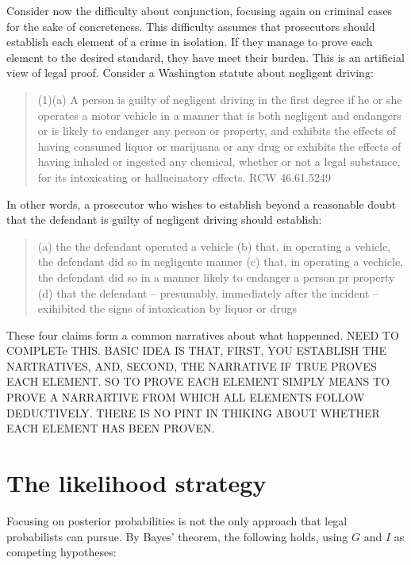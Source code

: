 \documentclass[10pt,dvipsnames,enabledeprecatedfontcommands]{scrartcl}
\begin{document}
Consider now the difficulty about conjunction, focusing again on
criminal cases for the sake of concreteness. This difficulty assumes
that prosecutors should establish each element of a crime in isolation.
If they manage to prove each element to the desired standard, they have
meet their burden. This is an artificial view of legal proof. Consider a
Washington statute about negligent driving:

\begin{quote}
(1)(a) A person is guilty of negligent driving in the first degree if he or she operates a motor vehicle in a manner that is both negligent and endangers or is likely to endanger any person or property, and exhibits the effects of having consumed liquor or marijuana or any drug or exhibits the effects of having inhaled or ingested any chemical, whether or not a legal substance, for its intoxicating or hallucinatory effects. RCW 46.61.5249
\end{quote}

\noindent In other words, a prosecutor who wishes to establish beyond a
reasonable doubt that the defendant is guilty of negligent driving
should establish:

\begin{quote}
(a) the the defendant operated a vehicle
(b) that, in operating a vehicle, the defendant did so in  negligente manner
(c) that, in operating a vechicle, the defendant did so in a manner likely to endanger a person pr property
(d) that the defendant -- presumably, immediately after the incident -- exihibited the signs of intoxication by liquor or drugs
\end{quote}

\noindent These four claims form a common narratives about what
happenned. NEED TO COMPLETe THIS. BASIC IDEA IS THAT, FIRST, YOU
ESTABLISH THE NARTRATIVES, AND, SECOND, THE NARRATIVE IF TRUE PROVES
EACH ELEMENT. SO TO PROVE EACH ELEMENT SIMPLY MEANS TO PROVE A
NARRARTIVE FROM WHICH ALL ELEMENTS FOLLOW DEDUCTIVELY. THERE IS NO PINT
IN THIKING ABOUT WHETHER EACH ELEMENT HAS BEEN PROVEN.

\hypertarget{the-likelihood-strategy}{%
\section{The likelihood strategy}\label{the-likelihood-strategy}}

Focusing on posterior probabilities is not the only approach that legal
probabilists can pursue. By Bayes' theorem, the following holds, using
\(G\) and \(I\) as competing hypotheses:
\end{document}

